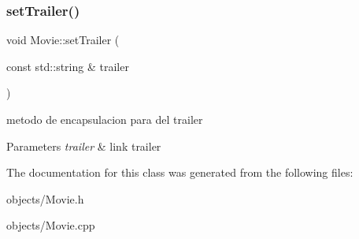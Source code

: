 \subsubsection{\texorpdfstring{set\+Trailer()}{setTrailer()}}
{\footnotesize\ttfamily void Movie\+::set\+Trailer (\begin{DoxyParamCaption}\item[{const std\+::string \&}]{trailer }\end{DoxyParamCaption})}



metodo de encapsulacion para del trailer 


\begin{DoxyParams}{Parameters}
{\em trailer} & link trailer \\
\hline
\end{DoxyParams}


The documentation for this class was generated from the following files\+:\begin{DoxyCompactItemize}
\item 
objects/Movie.\+h\item 
objects/Movie.\+cpp\end{DoxyCompactItemize}
